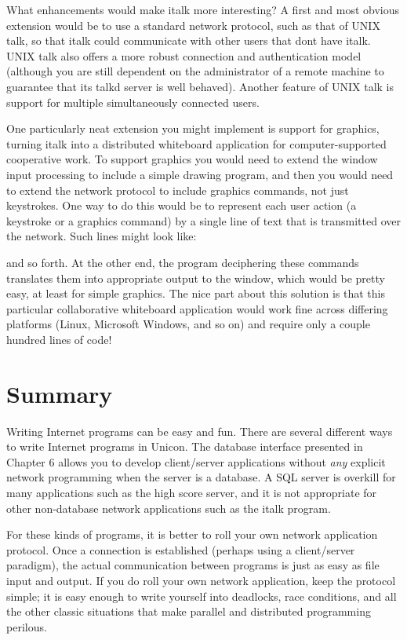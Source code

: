 What enhancements would make \textsf{italk} more interesting? A first
and most obvious extension would be to use a standard network protocol,
such as that of UNIX \textsf{talk}, so that \textsf{italk} could
communicate with other users that don{\textquotesingle}t have
\textsf{italk}. UNIX \textsf{talk} also offers a more robust connection
and authentication model (although you are still dependent on the
administrator of a remote machine to guarantee that its \textsf{talkd}
server is well behaved). Another feature of UNIX \textsf{talk} is
support for multiple simultaneously connected users.

One particularly neat extension you might implement is support for
graphics, turning \textsf{italk} into a distributed whiteboard
application for computer-supported cooperative work. To support
graphics you would need to extend the window input processing to
include a simple drawing program, and then you would need to extend the
network protocol to include graphics commands, not just keystrokes. One
way to do this would be to represent each user action (a keystroke or a
graphics command) by a single line of text that is transmitted over the
network. Such lines might look like:


and so forth. At the other end, the program deciphering these commands
translates them into appropriate output to the window, which would be
pretty easy, at least for simple graphics. The nice part about this
solution is that this particular collaborative whiteboard application
would work fine across differing platforms (Linux, Microsoft Windows,
and so on) and require only a couple hundred lines of code!

\section*{Summary}

Writing Internet programs can be easy and fun. There are several
different ways to write Internet programs in Unicon. The
database interface presented in Chapter 6 allows you to
develop client/server applications without \textit{any} explicit
network programming when the server is a database. A SQL
server is overkill for many applications such as the high score server,
and it is not appropriate for other non-database network applications
such as the \textsf{italk} program.

For these kinds of programs, it is better to {\textquotedbl}roll your
own{\textquotedbl} network application protocol. Once a connection is
established (perhaps using a client/server paradigm), the actual
communication between programs is just as easy as file input and
output. If you do roll your own network application, keep the protocol
simple; it is easy enough to write yourself into deadlocks, race
conditions, and all the other classic situations that make parallel and
distributed programming perilous.

